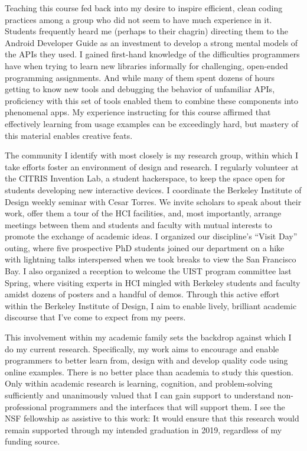 \documentclass[12pt]{memoir}
\begin{document}
Teaching this course fed back into my desire to inspire efficient, clean coding practices among a group who did not seem to have much experience in it.
Students frequently heard me (perhaps to their chagrin) directing them to the Android Developer Guide as an investment to develop a strong mental models of the APIs they used.
I gained first-hand knowledge of the difficulties programmers have when trying to learn new libraries informally for challenging, open-ended programming assignments.
And while many of them spent dozens of hours getting to know new tools and debugging the behavior of unfamiliar APIs, proficiency with this set of tools enabled them to combine these components into phenomenal apps.
My experience instructing for this course affirmed that effectively learning from usage examples can be exceedingly hard, but mastery of this material enables creative feats.

The community I identify with most closely is my research group, within which I take efforts foster an environment of design and research.
I regularly volunteer at the CITRIS Invention Lab, a student hackerspace, to keep the space open for students developing new interactive devices.
I coordinate the Berkeley Institute of Design weekly seminar with Cesar Torres.
We invite scholars to speak about their work, offer them a tour of the HCI facilities, and, most importantly, arrange meetings between them and students and faculty with mutual interests to promote the exchange of academic ideas.
I organized our discipline's ``Visit Day'' outing, where five prospective PhD students joined our department on a hike with lightning talks interspersed when we took breaks to view the San Francisco Bay.
I also organized a reception to welcome the UIST program committee last Spring, where visiting experts in HCI mingled with Berkeley students and faculty amidst dozens of posters and a handful of demos.
Through this active effort within the Berkeley Institute of Design, I aim to enable lively, brilliant academic discourse that I've come to expect from my peers.

This involvement within my academic family sets the backdrop against which I do my current research.
Specifically, my work aims to encourage and enable programmers to better learn from, design with and develop quality code using online examples.
There is no better place than academia to study this question.
Only within academic research is learning, cognition, and problem-solving sufficiently and unanimously valued that I can gain support to understand non-professional programmers and the interfaces that will support them.
I see the NSF fellowship as assistive to this work:
It would ensure that this research would remain supported through my intended graduation in 2019, regardless of my funding source.
\end{document}
